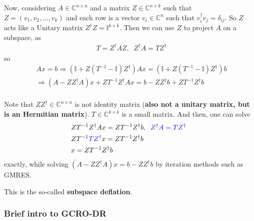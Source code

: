 Now, considering $A\in \mathbb{C}^{n\times n}$ and a matrix $Z\in \mathbb{C}^{n\times k}$ such that $Z=(v_1,v_2,\ldots,v_k)$ and each row is a vector $v_i\in \mathbb{C}^n$ such that $v_i^{\dagger}v_j=\delta _{ij}$. So $Z$ acts like a Unitary matrix $Z^{\dagger}Z=\mathbb{I}^{k\times k}$. Then we can use $Z$ to project $A$ on a subspace, as
\begin{equation}
\begin{split}
&T=Z^{\dagger}AZ,\;\;Z^{\dagger}A=TZ^{\dagger}
\end{split}
\end{equation}
so
\begin{equation}
\begin{split}
&Ax=b \Rightarrow \left(\mathbb{I}+Z\left(T^{-1}-\mathbb{I}\right)Z^{\dagger}\right)Ax= \left(\mathbb{I}+Z\left(T^{-1}-\mathbb{I}\right)Z^{\dagger}\right)b\\
&\Rightarrow \left(A-ZZ^{\dagger}A\right)x+ZT^{-1}Z^{\dagger}Ax=b-ZZ^{\dagger}b + ZT^{-1}Z^{\dagger}b\\
\end{split}
\label{eq.gcrodr.precondition}
\end{equation}

Note that $ZZ^{\dagger}\in \mathbb{C}^{n\times n}$ is not identity matrix (\textbf{also not a unitary matrix, but is an Hermitian matrix}). $T\in \mathbb{C}^{k\times k}$ is a small matrix. And then, one can solve
\begin{equation}
\begin{split}
&ZT^{-1}Z^{\dagger}Ax=ZT^{-1}Z^{\dagger}b ,\;\;\textcolor[rgb]{0,0,1}{Z^{\dagger}A=TZ^{\dagger}}\\
&ZT^{-1}\textcolor[rgb]{0,0,1}{TZ^{\dagger}}x=ZT^{-1}Z^{\dagger}b \\
&x=ZT^{-1}Z^{\dagger}b\\
\end{split}
\label{eq.gcrod.exactsolution}
\end{equation}
exactly, while solving $\left(A-ZZ^{\dagger}A\right)x=b-ZZ^{\dagger}b$ by iteration methods such as GMRES.

This is the so-called \textbf{subspace deflation}.

\subsubsection{\label{sec:gcrodr}Brief intro to GCRO-DR}

